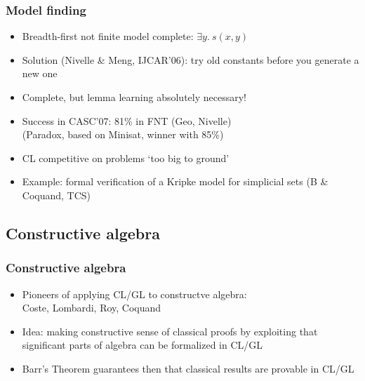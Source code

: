 \documentclass[handout,11pt]{beamer}
\newcommand{\weg}[1]{}
\begin{document}
\begin{frame}
\frametitle{Model finding}
 \begin{itemize}[<+->]   %
    \item Breadth-first not finite model complete: $\exists y.~s(x,y)$
    \item Solution (Nivelle \& Meng, IJCAR'06): try old constants
    before you generate a new one
    \item Complete, but lemma learning \alert{absolutely necessary}!
    \item Success in CASC'07: 81\% in FNT (Geo, Nivelle)\\
             (Paradox, based on Minisat, winner with 85\%)
    \item CL competitive on problems `too big to ground'
    \item Example: formal verification of a Kripke model for simplicial sets (B \& Coquand, TCS)
 \end{itemize}
\end{frame}              


\weg{
\begin{frame}[label=nDPmodel]
\small
\end{frame}

\frame
  {    
    \frametitle{Model} \vspace*{-.95in}
    \scalebox{0.40}
      {
    \texttt{[image: tree\_dpe]}
      }
  }
}%

\subsection{Constructive algebra}

\begin{frame}
\frametitle{Constructive algebra}
 \begin{itemize}[<+->]   %
    \item Pioneers of applying CL/GL to constructve algebra:\\
  Coste, Lombardi, Roy, %
Coquand
    \item Idea: making constructive sense of classical proofs by
  exploiting that significant parts of algebra can be formalized in CL/GL
    \item Barr's Theorem guarantees then that classical results are provable in CL/GL
 \end{itemize}
\end{frame}
\end{document}

